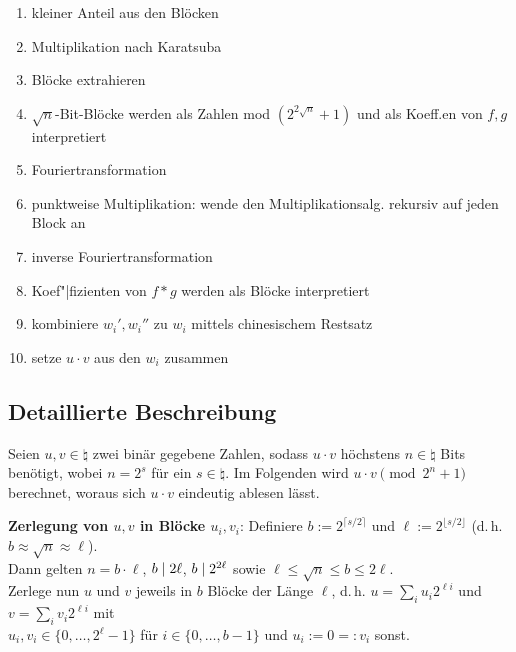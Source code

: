 \displaymathnormal
\begin{enumerate}
    \item
    kleiner Anteil aus den Blöcken

    \item
    Multiplikation nach Karatsuba

    \item
    Blöcke extrahieren

    \item
    $\sqrt{n}$-Bit-Blöcke werden als Zahlen mod $(2^{2\sqrt{n}} + 1)$ und als Koeff.en
    von $f, g$ interpretiert

    \item
    Fouriertransformation

    \item
    punktweise Multiplikation: wende den Multiplikationsalg. rekursiv auf jeden Block an

    \item
    inverse Fouriertransformation

    \item
    Koef"|fizienten von $f \ast g$ werden als Blöcke interpretiert

    \item
    kombiniere $w_i', w_i''$ zu $w_i$ mittels chinesischem Restsatz

    \item
    setze $u \cdot v$ aus den $w_i$ zusammen
\end{enumerate}

\pagebreak

\subsection{%
    Detaillierte Beschreibung%
}

Seien $u, v \in \natural$ zwei binär gegebene Zahlen,
sodass $u \cdot v$ höchstens $n \in \natural$ Bits benötigt, wobei $n = 2^s$ für ein
$s \in \natural$.
Im Folgenden wird $u \cdot v \pmod{2^n + 1}$ berechnet, woraus sich $u \cdot v$ eindeutig ablesen
lässt.

\textbf{Zerlegung von $u, v$ in Blöcke $u_i, v_i$}:
Definiere $b := 2^{\lceil s/2 \rceil}$ und $\ell := 2^{\lfloor s/2 \rfloor}$
(d.\,h. $b \approx \sqrt{n} \approx \ell$).\\
Dann gelten $n = b \cdot \ell$, $b \mid 2\ell$, $b \mid 2^{2\ell}$ sowie
$\ell \le \sqrt{n} \le b \le 2\ell$.\\
Zerlege nun $u$ und $v$ jeweils in $b$ Blöcke der Länge $\ell$,
d.\,h. $u = \sum_i u_i 2^{\ell i}$ und $v = \sum_i v_i 2^{\ell i}$ mit\\
$u_i, v_i \in \{0, \dotsc, 2^\ell - 1\}$ für $i \in \{0, \dotsc, b - 1\}$ und
$u_i := 0 =: v_i$ sonst.

